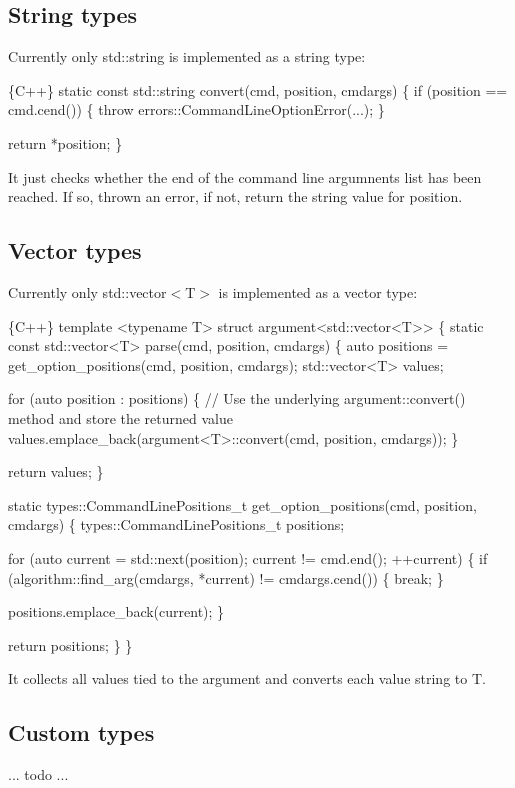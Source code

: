 \subsection*{String types}

Currently only {\ttfamily std\+::string} is implemented as a string type\+: 
\begin{DoxyCode}
\{C++\}
static const std::string convert(cmd, position, cmdargs)
\{
    if (position == cmd.cend())
    \{
        throw errors::CommandLineOptionError(...);
    \}

    return *position;
\}
\end{DoxyCode}


It just checks whether the end of the command line argumnents list has been reached. If so, thrown an error, if not, return the string value for {\ttfamily position}.

\subsection*{Vector types}

Currently only {\ttfamily std\+::vector$<$T$>$} is implemented as a vector type\+: 
\begin{DoxyCode}
\{C++\}
template <typename T>
struct argument<std::vector<T>>
\{
    static const std::vector<T> parse(cmd, position, cmdargs)
    \{
        auto positions = get\_option\_positions(cmd, position, cmdargs);
        std::vector<T> values;

        for (auto position : positions)
        \{
            // Use the underlying argument::convert() method and store the returned value
            values.emplace\_back(argument<T>::convert(cmd, position, cmdargs));
        \}

        return values;
    \}


    static types::CommandLinePositions\_t get\_option\_positions(cmd, position, cmdargs)
    \{
        types::CommandLinePositions\_t positions;

        for (auto current = std::next(position); current != cmd.end(); ++current)
        \{
            if (algorithm::find\_arg(cmdargs, *current) != cmdargs.cend())
            \{
                break;
            \}

            positions.emplace\_back(current);
        \}

        return positions;
    \}
\}
\end{DoxyCode}


It collects all values tied to the argument and converts each value string to {\ttfamily T}.

\subsection*{Custom types}

... todo ... 